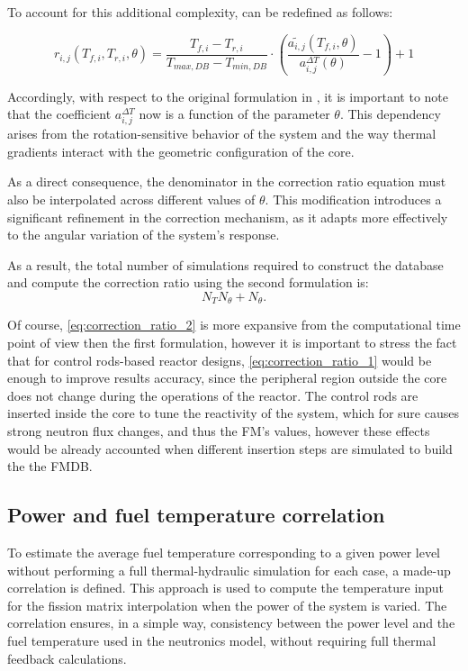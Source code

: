 \documentclass[preprint,review,12pt]{elsarticle}
\begin{document}
To account for this additional complexity,  can be redefined as follows:    

\begin{equation}
r_{i,j}(T_{f,i}, T_{r,i}, \theta) = \frac{T_{f,i} - T_{r,i}}{T_{max,DB} - T_{min,DB}} \cdot \left( \frac{ \tilde{a_{i,j}}(T_{f,i}, \theta)}{a_{i,j}^{\Delta T}(\theta)} - 1 \right) + 1
\label{eq:correction_ratio_2}
\end{equation}

Accordingly, with respect to the original formulation in , it is important to note that the coefficient $a_{i,j}^{\Delta T}$ now is a function of the parameter $\theta$. This dependency arises from the rotation-sensitive behavior of the system and the way thermal gradients interact with the geometric configuration of the core.

As a direct consequence, the denominator in the correction ratio equation must also be interpolated across different values of $\theta$. This modification introduces a significant refinement in the correction mechanism, as it adapts more effectively to the angular variation of the system’s response.

As a result, the total number of simulations required to construct the database and compute the correction ratio using the second formulation is:
\[
N_T N_{\theta} + N_{\theta}.
\]

Of course, \cref{eq:correction_ratio_2} is more expansive from the computational time point of view then the first formulation, however it is important to stress the fact that for control rods-based reactor designs, \cref{eq:correction_ratio_1} would be enough to improve results accuracy, since the peripheral region outside the core does not change during the operations of the reactor. The control rods are inserted inside the core to tune the reactivity of the system, which for sure causes strong neutron flux changes, and thus the FM's values, however these effects would be already accounted when different insertion steps are simulated to build the the FMDB.      


\subsection{Power and fuel temperature correlation}
To estimate the average fuel temperature corresponding to a given power level without performing a full thermal-hydraulic simulation for each case, a made-up correlation is defined. This approach is used to compute the temperature input for the fission matrix interpolation when the power of the system is varied. The correlation ensures, in a simple way, consistency between the power level and the fuel temperature used in the neutronics model, without requiring full thermal feedback calculations.
\end{document}
